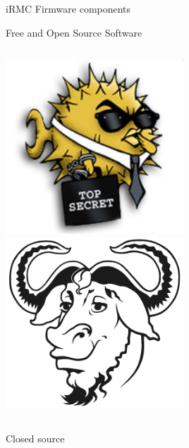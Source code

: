 \documentclass{beamer}
\begin{document}
\begin{frame}{iRMC Firmware components}
\begin{block}{Free and Open Source Software}
\begin{columns}[onlytextwidth]
\begin{column}{0.3\textwidth}
				\includegraphics[width=0.5\textwidth]{logo/openssh.png} 
				\includegraphics[width=0.5\textwidth]{logo/gnu.png}


			\end{column}
		\end{columns}
				
	  \end{block}
	  \pause

	  \begin{block}{Closed source}


\end{block}
\end{frame}
\end{document}
